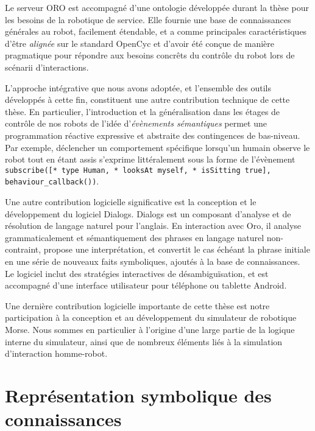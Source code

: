 Le serveur ORO est accompagné d'une ontologie développée durant la thèse pour
les besoins de la robotique de service. Elle fournie une base de connaissances
générales au robot, facilement étendable, et a comme principales
caractéristiques d'être \emph{alignée} sur le standard {\sc OpenCyc} et d'avoir
été conçue de manière pragmatique pour répondre aux besoins concrêts du
contrôle du robot lors de scénarii d'interactions.

L'approche intégrative que nous avons adoptée, et l'ensemble des outils
développés à cette fin, constituent une autre contribution technique de cette
thèse. En particulier, l'introduction et la généralisation dans les étages de
contrôle de nos robots de l'idée d'\emph{évènements sémantiques} permet une
programmation réactive expressive et abstraite des contingences de bas-niveau.
Par exemple, déclencher un comportement spécifique lorsqu'un humain observe le
robot tout en étant assis s'exprime littéralement sous la forme de l'évènement
{\tt subscribe([* type Human, * looksAt myself, * isSitting true],
behaviour\_callback())}.

Une autre contribution logicielle significative est la conception et le
développement du logiciel {\sc Dialogs}. {\sc Dialogs} est un composant
d'analyse et de résolution de langage naturel pour l'anglais. En interaction
avec {\sc Oro}, il analyse grammaticalement et sémantiquement des phrases en
langage naturel non-contraint, propose une interprétation, et convertit le cas
échéant la phrase initiale en une série de nouveaux faits symboliques, ajoutés
à la base de connaissances. Le logiciel inclut des stratégies interactives de
désambiguïsation, et est accompagné d'une interface utilisateur pour téléphone
ou tablette Android.

Une dernière contribution logicielle importante de cette thèse est notre
participation à la conception et au développement du simulateur de robotique
{\sc Morse}. Nous sommes en particulier à l'origine d'une large partie de la
logique interne du simulateur, ainsi que de nombreux éléments liés à la
simulation d'interaction homme-robot.


\section{Représentation symbolique des connaissances}

